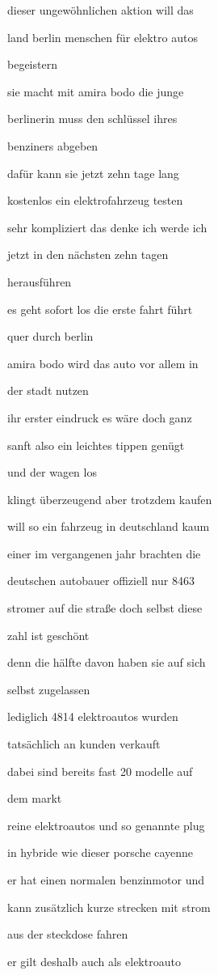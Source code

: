 \documentclass[a4paper, 11pt]{book} %
\begin{document}
dieser ungewöhnlichen aktion will das

land berlin menschen für elektro autos

begeistern

sie macht mit amira bodo die junge

berlinerin muss den schlüssel ihres

benziners abgeben

dafür kann sie jetzt zehn tage lang

kostenlos ein elektrofahrzeug testen

sehr kompliziert das denke ich werde ich

jetzt in den nächsten zehn tagen

herausführen

es geht sofort los die erste fahrt führt

quer durch berlin

amira bodo wird das auto vor allem in

der stadt nutzen

ihr erster eindruck es wäre doch ganz

sanft also ein leichtes tippen genügt

und der wagen los

klingt überzeugend aber trotzdem kaufen

will so ein fahrzeug in deutschland kaum

einer im vergangenen jahr brachten die

deutschen autobauer offiziell nur 8463

stromer auf die straße doch selbst diese

zahl ist geschönt

denn die hälfte davon haben sie auf sich

selbst zugelassen

lediglich 4814 elektroautos wurden

tatsächlich an kunden verkauft

dabei sind bereits fast 20 modelle auf

dem markt

reine elektroautos und so genannte plug

in hybride wie dieser porsche cayenne

er hat einen normalen benzinmotor und

kann zusätzlich kurze strecken mit strom

aus der steckdose fahren

er gilt deshalb auch als elektroauto
\end{document}
